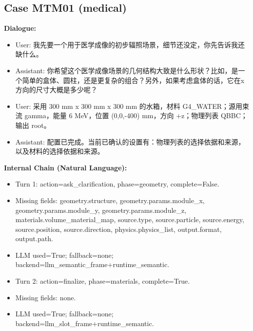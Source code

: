 \documentclass[11pt]{ctexart}
\begin{document}
\subsection{Case MTM01 (medical)}
\textbf{Dialogue:}
\begin{itemize}
\item User: 我先要一个用于医学成像的初步辐照场景，细节还没定，你先告诉我还缺什么。
\item Assistant: 你希望这个医学成像场景的几何结构大致是什么形状？比如，是一个简单的盒体、圆柱，还是更复杂的组合？另外，如果考虑盒体的话，它在x方向的尺寸大概是多少呢？
\item User: 采用 300 mm x 300 mm x 300 mm 的水箱，材料 G4\_WATER；源用束流 gamma，能量 6 MeV，位置 (0,0,-400) mm，方向 +z；物理列表 QBBC；输出 root。
\item Assistant: 配置已完成。当前已确认的设置有：物理列表的选择依据和来源，以及材料的选择依据和来源。
\end{itemize}
\textbf{Internal Chain (Natural Language):}
\begin{itemize}
\item Turn 1: action=ask\_clarification, phase=geometry, complete=False.
\item Missing fields: geometry.structure, geometry.params.module\_x, geometry.params.module\_y, geometry.params.module\_z, materials.volume\_material\_map, source.type, source.particle, source.energy, source.position, source.direction, physics.physics\_list, output.format, output.path.
\item LLM used=True; fallback=none; backend=llm\_semantic\_frame+runtime\_semantic.
\item Turn 2: action=finalize, phase=materials, complete=True.
\item Missing fields: none.
\item LLM used=True; fallback=none; backend=llm\_slot\_frame+runtime\_semantic.
\end{itemize}
\end{document}
